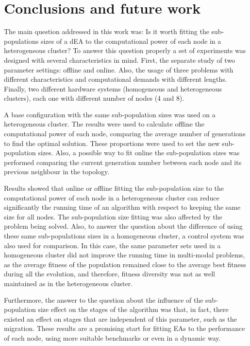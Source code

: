 \documentclass[final,1p,times]{elsarticle}
\begin{document}
\section{Conclusions and future work}



The main question addressed in this work was: Is it worth fitting the 
sub-populations sizes of a dEA to the computational power of each node 
in a heterogeneous cluster? To answer this question properly a set of 
experiments was designed with several characteristics in mind. 
First, the separate study of two parameter settings: offline and 
online. Also, the usage of three problems with different characteristics and 
computational demands with different lengths. Finally, two different hardware 
systems (homogeneous and heterogeneous clusters),  each one with different number
 of nodes (4 and 8).

A base configuration with the same sub-population sizes was used on a heterogeneous cluster. The results were used to calculate offline the computational power of each node, comparing the average number of generations to find the optimal solution. These proportions were used to set the new sub-population sizes. Also, a possible way to fit online the sub-population sizes was performed comparing the current generation number between each node and its previous neighbour in the topology. 

Results showed that online or offline fitting the sub-population size to the computational power of each node in a heterogeneous cluster
can reduce significantly the running time of an algorithm with respect
to keeping the same size for all nodes. The sub-population size fitting was also affected by the problem being solved. Also, to answer the question about the difference of using these same sub-populations sizes in a homogeneous cluster, a control system was also used for comparison. In this case, the same parameter sets used in a homogeneous cluster did not improve the running time in multi-modal problems, as the average fitness of the population remained close to the average best fitness during all the evolution, and therefore, fitness diversity was not as well maintained as in the heterogeneous cluster.



Furthermore, the answer to the question about the influence of the sub-population size effect on the stages
of the algorithm was that, in fact, there existed an effect on stages that are independent of this parameter, such as
the migration.  These results are a promising start for fitting EAs to the performance of each  node, using more suitable benchmarks or even in a dynamic way. 
\end{document}
